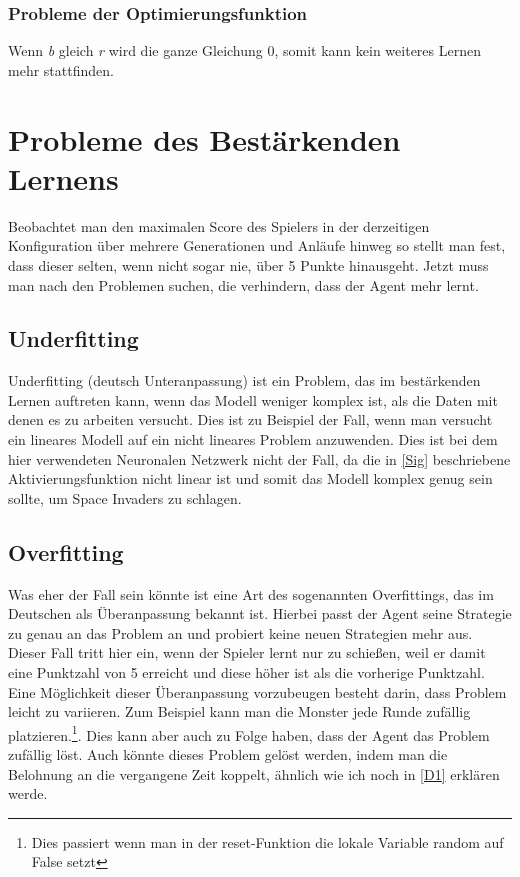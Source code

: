 \subsubsection*{Probleme der Optimierungsfunktion}
Wenn \textit{b} gleich \textit{r} wird die ganze Gleichung 0, somit kann kein weiteres Lernen mehr stattfinden.

\section{Probleme des Bestärkenden Lernens}
Beobachtet man den maximalen Score des Spielers in der derzeitigen Konfiguration über mehrere Generationen und Anläufe hinweg so stellt man fest, dass dieser selten, wenn nicht sogar nie, über 5 Punkte hinausgeht. Jetzt muss man nach den Problemen suchen, die verhindern, dass der Agent mehr lernt.
\subsection{Underfitting}
Underfitting (deutsch Unteranpassung) ist ein Problem, das im bestärkenden Lernen auftreten kann, wenn das Modell weniger komplex ist, als die Daten mit denen es zu arbeiten versucht\cite[vgl.][S.6-7]{koehrsen2018overfitting}. Dies ist zu Beispiel der Fall, wenn man versucht ein lineares  Modell auf ein nicht lineares Problem anzuwenden. Dies ist bei dem hier verwendeten Neuronalen Netzwerk nicht der Fall, da die in \ref{Sig} beschriebene Aktivierungsfunktion nicht linear ist und somit das Modell komplex genug sein sollte, um Space Invaders zu schlagen.

\subsection{Overfitting}
Was eher der Fall sein könnte ist eine Art des sogenannten Overfittings, das im Deutschen als Überanpassung bekannt ist. Hierbei passt der Agent seine Strategie zu genau an das Problem an und probiert keine neuen Strategien mehr aus. Dieser Fall tritt hier ein, wenn der Spieler lernt nur zu schießen, weil er damit eine Punktzahl von 5 erreicht und diese höher ist als die vorherige Punktzahl. Eine Möglichkeit dieser Überanpassung vorzubeugen besteht darin, dass Problem leicht zu variieren. Zum Beispiel kann man die Monster jede Runde zufällig platzieren.\footnote{ Dies passiert wenn man in der reset-Funktion die lokale Variable  random auf False setzt}. Dies kann aber auch zu Folge haben, dass der Agent das Problem zufällig löst. Auch könnte dieses Problem gelöst werden, indem man die Belohnung an die vergangene Zeit koppelt, ähnlich wie ich noch in \ref{D1} erklären werde.